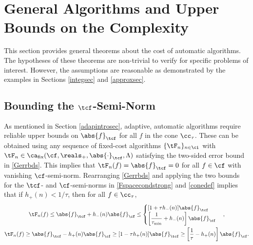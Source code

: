 \documentclass[]{elsarticle}
\DeclareMathOperator{\fix}{fix}
\theoremstyle{definition}
\theoremstyle{remark}
\newcommand{\Fnorm}[1]{\abs{#1}_{\cf}}
\newcommand{\Ftnorm}[1]{\abs{#1}_{\tcf}}
\begin{document}
\section{General Algorithms and Upper Bounds on the Complexity} \label{genthmsec}

This section provides general theorems about the cost of automatic algorithms.  The hypotheses of these theorems are non-trivial to verify for specific problems of interest.  However, the assumptions are reasonable as demonstrated by the examples in Sections \ref{integsec} and \ref{approxsec}.  

\subsection{Bounding the $\tcf$-Semi-Norm} \label{Galgosec}

As mentioned in Section \ref{adapintrosec}, adaptive, automatic algorithms require reliable upper bounds on $\Ftnorm{f}$ for all $f$ in the cone $\cc_{\tau}$. These can be obtained using any sequence of fixed-cost algorithms $\{\tF_n\}_{n \in \ci}$ with $\tF_n \in \ca_{\fix}(\cf,\reals_+,\Ftnorm{\cdot},\Lambda)$ satisfying the two-sided error bound in \eqref{Gerrbds}.  This implies that $\tF_n(f)=\Ftnorm{f}=0$ for all $f \in \cf$ with vanishing $\cf$-semi-norm.  Rearranging \eqref{Gerrbds} and applying the two bounds for the $\tcf$- and $\cf$-semi-norms in \eqref{Fspacecondstrong} and \eqref{conedef} implies that if $h_{ +}(n) < 1/\tau$, then for all $f \in \cc_{\tau}$,
\begin{gather*} 
\tF_n(f) \le \Ftnorm{f} + h_{-}(n)\Fnorm{f} \le \begin{cases} [1+ \tau h_{-}(n)]\Ftnorm{f} \\
\displaystyle \left [\frac{1}{\tau_{\min}}+h_{-}(n) \right]\Fnorm{f} 
\end{cases},\\
\tF_n(f) \ge \Ftnorm{f} - h_{+}(n)\Fnorm{f} \ge [1 - \tau h_{+}(n)]\Ftnorm{f}
\ge \left [\frac{1}{\tau}-h_{+}(n) \right]\Fnorm{f}.
\end{gather*}
\end{document}
